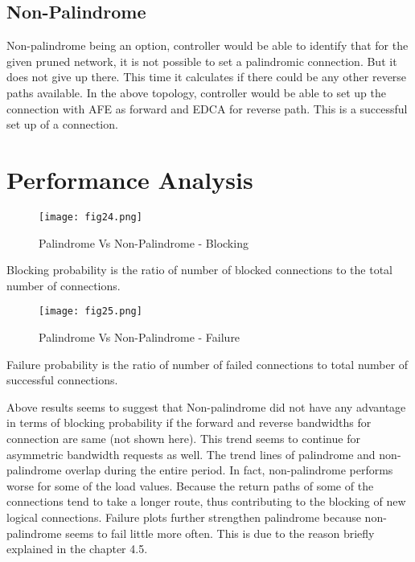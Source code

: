 \subsection {Non-Palindrome}
	Non-palindrome being an option, controller would be able to identify that for the given pruned network, it is not possible to set a palindromic connection. But it does not give up there. This time it calculates if there could be any other reverse paths available. In the above topology, controller would be able to set up the connection with AFE as forward and EDCA for reverse path. This is a successful set up of a connection.  

\section {Performance Analysis}


\begin{figure}[hbt!]
\centering
\texttt{[image: fig24.png]}
\caption{Palindrome Vs Non-Palindrome - Blocking}
\label{fig:palinBlock}
\end{figure}

Blocking probability is the ratio of number of blocked connections  to the total number of connections.


\begin{figure}[H]
\centering
\texttt{[image: fig25.png]}
\caption{Palindrome Vs Non-Palindrome - Failure}
\label{fig:palinBlock}
\end{figure}

Failure probability is the ratio of number of failed connections to total number of successful connections.

Above results seems to suggest that Non-palindrome did not have any advantage in terms of blocking probability if the forward and reverse bandwidths for connection are same (not shown here). This trend seems to continue for asymmetric bandwidth requests as well.  The trend lines of palindrome and non-palindrome overlap during the entire period. In fact, non-palindrome performs worse for some of the load values. Because the return paths of some of the connections tend to take a longer route, thus contributing to the blocking of new logical connections. Failure plots further strengthen palindrome because non-palindrome seems to fail little more often. This is due to the reason briefly explained in the chapter 4.5.

